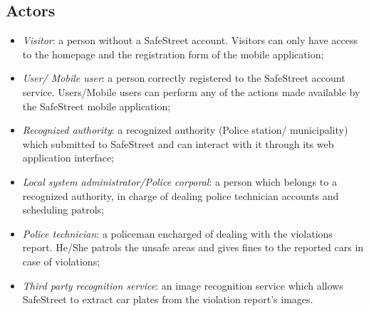 \subsection{Actors}

\begin{itemize}
    \item \textit{Visitor}: a person without a SafeStreet account. Visitors can only have access to the homepage and the registration form of the mobile application;
    \item \textit{User/ Mobile user}: a person correctly registered to the SafeStreet account service. Users/Mobile users can perform any of the actions made available by the SafeStreet mobile application; 
    \item \textit{Recognized authority}: a recognized authority (Police station/ municipality) which submitted to SafeStreet and can interact with it through its web application interface;
    \item \textit{Local system administrator/Police corporal}: a person which belongs to a recognized authority, in charge of dealing police technician accounts and scheduling patrols;
    \item \textit{Police technician}: a policeman encharged of dealing with the violations report. He/She patrols the unsafe areas and gives fines to the reported cars in case of violations;
    \item \textit{Third party recognition service}: an image recognition service which allows SafeStreet to extract car plates from the violation report's images.
\end{itemize}

